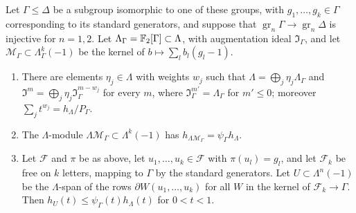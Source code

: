 \begin{lemma}\label{tw:filtered-local-freeness}
Let $\Gamma\le\Delta$ be a subgroup isomorphic to one of these groups, with
$g_1,\dots,g_k\in\Gamma$ corresponding to its standard generators, and
suppose that $\operatorname{gr}_n\Gamma\to\operatorname{gr}_n\Delta$ is
injective for $n=1,2$. Let $\Lambda_\Gamma=\mathbb F_2[\Gamma]\subset\Lambda$, with
augmentation ideal $\mathfrak I_\Gamma$, and let
$\mathcal M_\Gamma\subset\Lambda_\Gamma^k(-1)$ be the kernel of
$b\mapsto\sum_lb_l(g_l-1)$.
\begin{enumerate}
\item[(a)] There are elements $\eta_j\in\Lambda$ with weights $w_j$ such that
 $\Lambda=\bigoplus_j\eta_j\Lambda_\Gamma$ and
 $\mathfrak I^m=\bigoplus_j\eta_j\mathfrak I_\Gamma^{m-w_j}$ for every $m$,
 where $\mathfrak I_\Gamma^{m'}=\Lambda_\Gamma$ for $m'\le0$; moreover
 $\sum_jt^{w_j}=h_\Lambda/P_\Gamma$.
\item[(b)] The $\Lambda$-module $\Lambda\mathcal M_\Gamma\subset\Lambda^k(-1)$
 has $h_{\Lambda\mathcal M_\Gamma}=\psi_\Gamma h_\Lambda$.
\item[(c)] Let $\mathcal F$ and $\pi$ be as above, let
 $u_1,\dots,u_k\in\mathcal F$ with $\pi(u_l)=g_l$, and let $\mathcal F_k$ be
 free on $k$ letters, mapping to $\Gamma$ by the standard generators. Let
 $U\subset\Lambda^n(-1)$ be the $\Lambda$-span of the rows
 $\partial W(u_1,\dots,u_k)$ for all $W$ in the kernel of
 $\mathcal F_k\to\Gamma$. Then $h_U(t)\le\psi_\Gamma(t)h_\Lambda(t)$ for
 $0<t<1$.
\end{enumerate}
\end{lemma}

